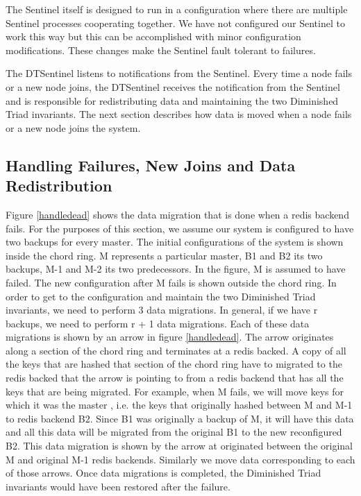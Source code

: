 \documentclass[10pt,twocolumn,letterpaper]{article}
\begin{document}
The Sentinel itself is designed to run in a configuration where there are multiple Sentinel processes cooperating together. We have not configured our Sentinel to work this way but this can be accomplished with minor configuration modifications. These changes make the Sentinel fault tolerant to failures. 

The DTSentinel listens to notifications from the Sentinel. Every time a node fails or a new node joins, the DTSentinel receives the notification from the Sentinel and is responsible for redistributing data and maintaining the two Diminished Triad invariants. The next section describes how data is moved when a node fails or a new node joins the system.

\subsection{Handling Failures, New Joins and Data Redistribution}

Figure \ref{handledead} shows the data migration that is done when a redis backend fails. For the purposes of this section, we assume our system is configured to have two backups for every master. The initial configurations of the system is shown inside the chord ring. M represents a particular master, B1 and B2 its two backups, M-1 and M-2 its two predecessors. In the figure, M is assumed to have failed. The new configuration after M fails is shown outside the chord ring. In order to get to the configuration and maintain the two Diminished Triad invariants, we need to perform 3 data migrations. In general, if we have r backups, we need to perform r + 1 data migrations. Each of these data migrations is shown by an arrow in figure \ref{handledead}. The arrow originates along a section of the chord ring and terminates at a redis backed. A copy of all the keys that are hashed that section of the chord ring have to migrated to the redis backed that the arrow is pointing to from a redis backend that has all the keys that are being migrated. For example, when M fails, we will move keys for which it was the master , i.e. the keys that originally hashed between M and M-1 to redis backend B2. Since B1 was originally a backup of M, it will have this data and all this data will be migrated from the original B1 to the new reconfigured B2. This data migration is shown by the arrow at originated between the original M and original M-1 redis backends. Similarly we move data corresponding to each of those arrows. Once data migrations is completed, the Diminished Triad invariants would have been restored after the failure.
\end{document}
